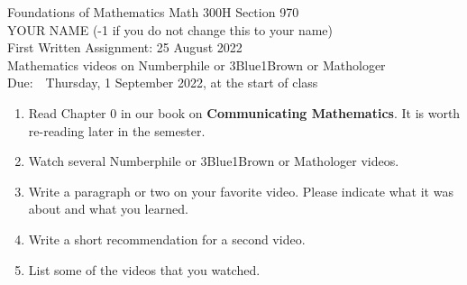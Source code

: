\documentclass[12pt]{article}
\begin{document}
\LARGE 
\noindent
{\color{Maroon}Foundations of Mathematics \hfill Math 300H Section 970}\vspace{2pt}\\
\Large YOUR NAME (-1 if you do not change this to your name)\vspace{2pt}\\
\large
First Written Assignment: \hfill 25 August 2022\\
Mathematics videos on Numberphile or 3{\color{blue}Blue}1{\color{brown}Brown} or Mathologer\\

Due:\ \ Thursday, 1 September 2022, at the start of class\vspace{20pt}
\normalsize

\begin{enumerate}

\item  Read Chapter 0 in our book on {\bf Communicating Mathematics}.  It is worth re-reading later in the semester.

\item  Watch several Numberphile or 3{\color{blue}Blue}1{\color{brown}Brown}  or Mathologer videos.
   
\item     Write a paragraph or two on your favorite video.
  Please indicate what it was about and what you learned.


  \item   Write a short recommendation for a second video.

    
  \item   List some of the videos that you watched.


\end{enumerate}
\end{document}
